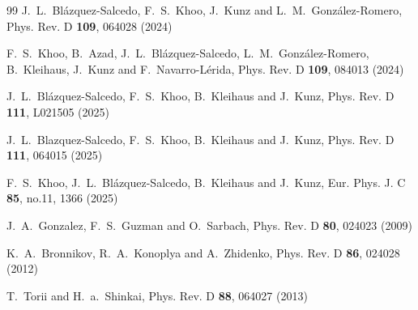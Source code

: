 \documentclass[floats,floatfix,showpacs,amssymb,prd,superscriptaddress,nofootinbib,nolongbibliography,reprint]{revtex4-2}
\begin{document}
\begin{thebibliography}{99}
J.~L.~Bl\'azquez-Salcedo, F.~S.~Khoo, J.~Kunz and L.~M.~Gonz\'alez-Romero,
Phys. Rev. D \textbf{109}, 064028 (2024)

F.~S.~Khoo, B.~Azad, J.~L.~Bl\'azquez-Salcedo, L.~M.~Gonz\'alez-Romero, B.~Kleihaus, J.~Kunz and F.~Navarro-L\'erida,
Phys. Rev. D \textbf{109}, 084013 (2024)

J.~L.~Bl{\'a}zquez-Salcedo, F.~S.~Khoo, B.~Kleihaus and J.~Kunz,
Phys. Rev. D \textbf{111}, L021505 (2025)

J.~L.~Blazquez-Salcedo, F.~S.~Khoo, B.~Kleihaus and J.~Kunz,
Phys. Rev. D \textbf{111}, 064015 (2025)


{
F.~S.~Khoo, J.~L.~Bl{\'a}zquez-Salcedo, B.~Kleihaus and J.~Kunz,
Eur. Phys. J. C \textbf{85}, no.11, 1366 (2025)
}


J.~A.~Gonzalez, F.~S.~Guzman and O.~Sarbach,
Phys. Rev. D \textbf{80}, 024023 (2009)




{
K.~A.~Bronnikov, R.~A.~Konoplya and A.~Zhidenko,
Phys. Rev. D \textbf{86}, 024028 (2012)
}


T.~Torii and H.~a.~Shinkai,
Phys. Rev. D \textbf{88}, 064027 (2013)



\end{thebibliography}
\end{document}
